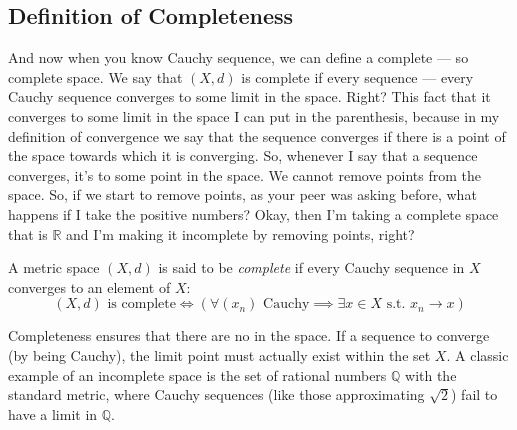 
\subsection{Definition of Completeness}

\begin{spoken-clean}[00:18:49 - 00:20:18]
And now when you know Cauchy sequence, we can define a complete — so complete space. We say that $(X, d)$ is complete if every sequence — every Cauchy sequence converges to some limit in the space. Right? This fact that it converges to some limit in the space I can put in the parenthesis, because in my definition of convergence we say that the sequence converges if there is a point of the space towards which it is converging. So, whenever I say that a sequence converges, it's to some point in the space. We cannot remove points from the space. So, if we start to remove points, as your peer was asking before, what happens if I take the positive numbers? Okay, then I'm taking a complete space that is $\mathbb{R}$ and I'm making it incomplete by removing points, right?
\end{spoken-clean}

\begin{math-stroke}
\begin{definition}\label{def:complete-space}
A metric space $(X, d)$ is said to be \emph{complete} if every Cauchy sequence in $X$ converges to an element of $X$:
\[ (X, d) \text{ is complete} \iff \left( \forall (x_n) \text{ Cauchy} \implies \exists x \in X \text{ s.t. } x_n \to x \right) \]
\end{definition}

\begin{explanation-of-steps}
Completeness ensures that there are no  in the space. If a sequence  to converge (by being Cauchy), the limit point must actually exist within the set $X$. A classic example of an incomplete space is the set of rational numbers $\mathbb{Q}$ with the standard metric, where Cauchy sequences (like those approximating $\sqrt{2}$) fail to have a limit in $\mathbb{Q}$.
\end{explanation-of-steps}
\end{math-stroke}

